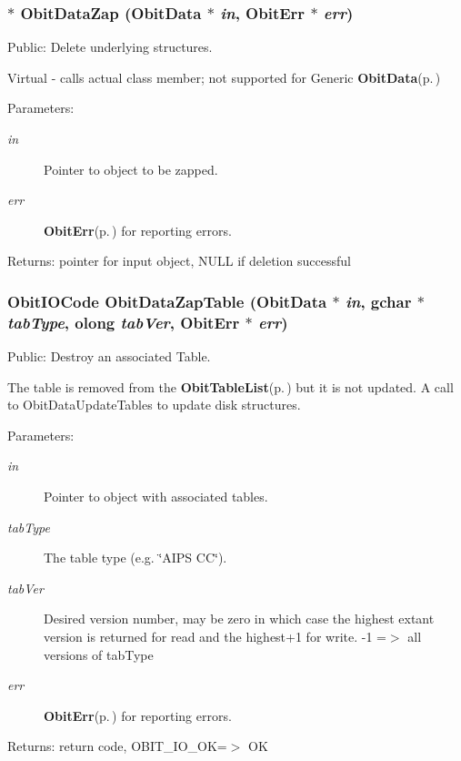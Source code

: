 \subsubsection{$\ast$ Obit\-Data\-Zap ({\bf Obit\-Data} $\ast$ {\em in}, {\bf Obit\-Err} $\ast$ {\em err})}\label{ObitData_8c_a12}


Public: Delete underlying structures. 

Virtual - calls actual class member; not supported for Generic {\bf Obit\-Data}{\rm (p.\,\pageref{structObitData})} \begin{Desc}
\item[Parameters:]
\begin{description}
\item[{\em in}]Pointer to object to be zapped. \item[{\em err}]{\bf Obit\-Err}{\rm (p.\,\pageref{structObitErr})} for reporting errors. \end{description}
\end{Desc}
\begin{Desc}
\item[Returns:]pointer for input object, NULL if deletion successful \end{Desc}
\subsubsection{\setlength{\rightskip}{0pt plus 5cm}Obit\-IOCode Obit\-Data\-Zap\-Table ({\bf Obit\-Data} $\ast$ {\em in}, gchar $\ast$ {\em tab\-Type}, {\bf olong} {\em tab\-Ver}, {\bf Obit\-Err} $\ast$ {\em err})}\label{ObitData_8c_a20}


Public: Destroy an associated Table. 

The table is removed from the {\bf Obit\-Table\-List}{\rm (p.\,\pageref{structObitTableList})} but it is not updated. A call to Obit\-Data\-Update\-Tables to update disk structures. \begin{Desc}
\item[Parameters:]
\begin{description}
\item[{\em in}]Pointer to object with associated tables. \item[{\em tab\-Type}]The table type (e.g. \char`\"{}AIPS CC\char`\"{}). \item[{\em tab\-Ver}]Desired version number, may be zero in which case the highest extant version is returned for read and the highest+1 for write. -1 =$>$ all versions of tab\-Type \item[{\em err}]{\bf Obit\-Err}{\rm (p.\,\pageref{structObitErr})} for reporting errors. \end{description}
\end{Desc}
\begin{Desc}
\item[Returns:]return code, OBIT\_\-IO\_\-OK=$>$ OK \end{Desc}
